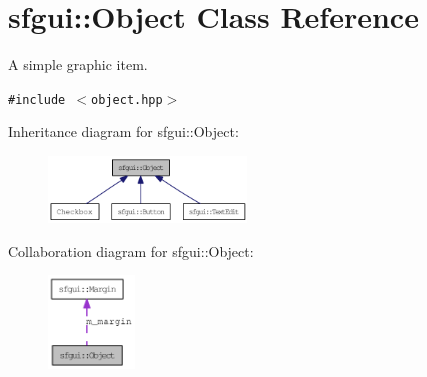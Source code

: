 \hypertarget{classsfgui_1_1Object}{
\section{sfgui::Object Class Reference}
\label{classsfgui_1_1Object}
}
A simple graphic item.  


{\tt \#include $<$object.hpp$>$}

Inheritance diagram for sfgui::Object:\nopagebreak
\begin{figure}[H]
\begin{center}
\leavevmode
\includegraphics[width=149pt]{classsfgui_1_1Object__inherit__graph}
\end{center}
\end{figure}
Collaboration diagram for sfgui::Object:\nopagebreak
\begin{figure}[H]
\begin{center}
\leavevmode
\includegraphics[width=65pt]{classsfgui_1_1Object__coll__graph}
\end{center}
\end{figure}
